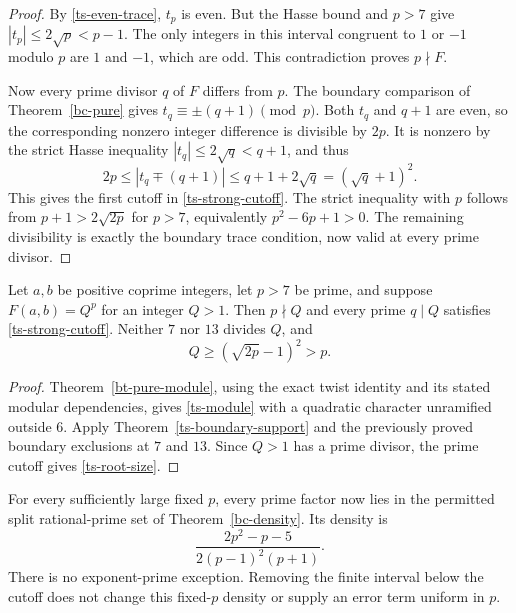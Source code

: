 \begin{proof}
By \eqref{ts-even-trace}, $t_p$ is even. But the Hasse bound and
$p>7$ give $|t_p|\le2\sqrt p<p-1$. The only integers in this
interval congruent to $1$ or $-1$ modulo $p$ are $1$ and $-1$,
which are odd. This contradiction proves $p\nmid F$.

Now every prime divisor $q$ of $F$ differs from $p$. The boundary comparison
of Theorem~\ref{bc-pure} gives $t_q\equiv\pm(q+1)\pmod p$.
Both $t_q$ and $q+1$ are even, so the corresponding nonzero
integer difference is divisible by $2p$. It is nonzero by the strict
Hasse inequality $|t_q|\le2\sqrt q<q+1$, and thus
\[
 2p\le |t_q\mp(q+1)|\le q+1+2\sqrt q=(\sqrt q+1)^2.
\]
This gives the first cutoff in \eqref{ts-strong-cutoff}. The strict
inequality with $p$ follows from $p+1>2\sqrt{2p}$ for $p>7$,
equivalently $p^2-6p+1>0$. The remaining divisibility is exactly
the boundary trace condition, now valid at every prime divisor.
\end{proof}

\begin{corollary}
\label{ts-pure-support}
Let $a,b$ be positive coprime integers, let $p>7$ be prime, and
suppose $F(a,b)=Q^p$ for an integer $Q>1$. Then $p\nmid Q$ and
every prime $q\mid Q$ satisfies \eqref{ts-strong-cutoff}. Neither $7$
nor $13$ divides $Q$, and
\begin{equation}\label{ts-root-size}
 Q\ge(\sqrt{2p}-1)^2>p.
\end{equation}
\end{corollary}
\begin{proof}
Theorem~\ref{bt-pure-module}, using the exact twist identity and its
stated modular dependencies, gives \eqref{ts-module} with a quadratic
character unramified outside $6$. Apply
Theorem~\ref{ts-boundary-support} and the previously proved boundary
exclusions at $7$ and $13$. Since $Q>1$ has a prime divisor, the
prime cutoff gives \eqref{ts-root-size}.
\end{proof}

For every sufficiently large fixed $p$, every prime factor now lies
in the permitted split rational-prime set of Theorem~\ref{bc-density}.
Its density is
\[
 \frac{2p^2-p-5}{2(p-1)^2(p+1)}.
\]
There is no exponent-prime exception. Removing the finite interval
below the cutoff does not change this fixed-$p$ density or supply
an error term uniform in $p$.

